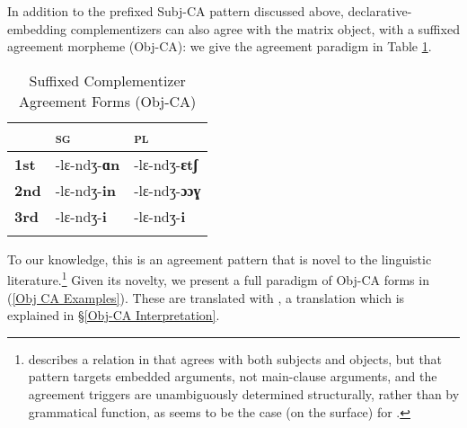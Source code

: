 \documentclass[output=paper
,newtxmath
,modfonts
,nonflat]{langsci/langscibook}
\begin{document}
In addition to the prefixed Subj-CA pattern discussed above,  declarative-embedding complementizers can also agree with the matrix object, with a suffixed agreement morpheme (Obj-CA): we give the agreement paradigm in Table \ref{Obj CA Forms Table}. 

\pagebreak

\begin{table}
\caption{Suffixed Complementizer Agreement Forms (Obj-CA)}
\label{Obj CA Forms Table}
 \begin{tabular}{lll} 
  \lsptoprule
   {} & \textsc{\textsc{sg}} & \textsc{pl} \\ 
  \midrule
   \textbf{1st} & -lɛ-ndʒ-\textbf{ɑn} & -lɛ-ndʒ-\textbf{ɛtʃ} \\
   \textbf{2nd} & -lɛ-ndʒ-\textbf{in} & -lɛ-ndʒ-\textbf{ɔɔɣ} \\
   \textbf{3rd} & -lɛ-ndʒ-\textbf{i} & -lɛ-ndʒ-\textbf{i} \\
  \lspbottomrule
 \end{tabular}
\end{table}

\noindent To our knowledge, this is an agreement pattern that is novel to the linguistic literature.\footnote{\citet{Deal:2015} describes a  relation in  that agrees with both subjects and objects, but that pattern targets embedded arguments, not main-clause arguments, and the agreement triggers are unambiguously determined structurally, rather than by grammatical function, as seems to be the case (on the surface) for .}  Given its novelty, we present a full paradigm of Obj-CA forms in (\ref{Obj CA Examples}). These are translated with , a translation which is explained in \S \ref{Obj-CA Interpretation}. 
\end{document}
